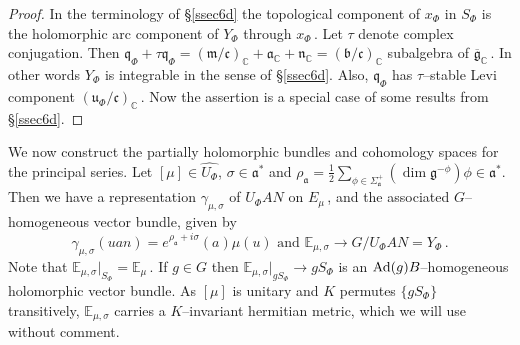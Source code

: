 \documentclass{conm-p-l}
\renewcommand{\gg}{\mathfrak{g}}
\newcommand{\gq}{\mathfrak{q}}
\def\ga{\mathfrak{a}}
\def\gb{\mathfrak{b}}
\def\gc{\mathfrak{c}}
\def\gg{\mathfrak{g}}
\def\gm{\mathfrak{m}}
\def\gn{\mathfrak{n}}
\def\gq{\mathfrak{q}}
\def\gu{\mathfrak{u}}
\def\Ad{{\rm Ad}}
\def\C{\mathbb{C}}
\def\E{\mathbb{E}}
\begin{document}
\begin{proof} In the terminology of \S \ref{ssec6d} the topological 
component of $x_\Phi$ in $S_\Phi$ is the holomorphic arc component of 
$Y_\Phi$ through $x_\Phi$\,.  Let $\tau$ denote complex conjugation.  Then
$\gq_\Phi + \tau\gq_\Phi = (\gm/\gc)_\C + \ga_\C + \gn_\C = (\gb/\gc)_\C$
subalgebra of $\overline{\gg}_\C$\,.  In other words $Y_\Phi$ is integrable
in the sense of \S \ref{ssec6d}.  Also, $\gq_\Phi$ has $\tau$--stable 
Levi component $(\gu_\Phi/\gc)_\C$\,.  Now the assertion is a special 
case of some results from \S \ref{ssec6d}.
\end{proof}

We now construct the partially holomorphic bundles and cohomology spaces for
the principal series.  Let $[\mu] \in \widehat{U_\Phi}$, $\sigma \in \ga^*$
and $\rho_\ga = \tfrac{1}{2}\sum_{\phi \in \Sigma_\ga^+} 
(\dim \gg^{-\phi})\phi \in \ga^*$.  Then we have a representation 
$\gamma_{\mu,\sigma}$ of $U_\Phi AN$ on $E_\mu$\,, and the associated
$G$--homogeneous vector bundle, given by
\begin{equation}\label{1.2.13}
\gamma_{\mu,\sigma}(uan) = e^{\rho_\ga +i\sigma}(a)\mu(u) \text{ and }
\E_{\mu,\sigma} \to G/U_\Phi AN = Y_\Phi\,.
\end{equation}
Note that $\E_{\mu,\sigma}|_{S_\Phi} = \E_{\mu}$\,.  If $g \in G$ then
$\E_{\mu,\sigma}|_{gS_\Phi} \to gS_\Phi$ is an $\Ad(g)B$--homogeneous 
holomorphic vector bundle.  As $[\mu]$ is unitary and $K$ permutes
$\{gS_\Phi\}$ transitively, $\E_{\mu,\sigma}$ carries a $K$--invariant 
hermitian metric, which we will use without comment.
\end{document}
